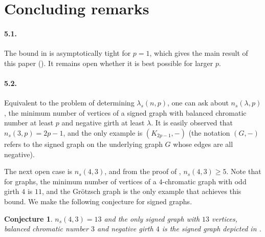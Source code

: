 \documentclass{article}
\newtheorem{conjecture}[theorem]{Conjecture}
\begin{document}
\section{Concluding remarks}
\paragraph{5.1.} The bound in  is asymptotically tight for $p=1$, which gives the main result of this paper (). It remains open whether it is best possible for larger $p$.

\paragraph{5.2.} Equivalent to the problem of determining $\lambda_s(n,p)$, one can ask about $n_s(\lambda,p)$, the minimum number of vertices of a signed graph with balanced chromatic number at least $p$ and negative girth at least $\lambda$. It is easily observed that $n_s(3,p)=2p-1$, and the only example is $(K_{2p-1},-)$ (the notation $(G,-)$ refers to the signed graph on the underlying graph $G$ whose edges are all negative).

The next open case is $n_s(4,3)$, and from the proof of , $n_s(4,3)\geq 5$. Note that for graphs, the minimum number of vertices of a $4$-chromatic graph with odd girth $4$ is $11$, and the Gr\"{o}tzsch graph is the only example that achieves this bound. We make the following conjecture for signed graphs.

\begin{conjecture}
    $n_s(4,3)=13$ and the only signed graph with $13$ vertices, balanced chromatic number $3$ and negative girth $4$ is the signed graph depicted in .
\end{conjecture}
\end{document}
